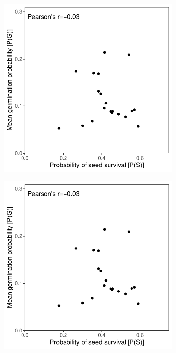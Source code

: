 \documentclass[12pt, oneside, titlepage]{article}   	%
\begin{document}
 
 \begin{figure}
\centering
\begin{subfigure}[h]{.65\textwidth}
\centering
       \includegraphics[page=1,width=1\textwidth]{../figures/germ_surv_correlation.pdf}  
\end{subfigure}

\begin{subfigure}[h]{.9\textwidth}
\centering
       \includegraphics[page=2,width=1\textwidth]{../figures/germ_surv_correlation.pdf}  
\end{subfigure}


\end{figure}
\end{document}
